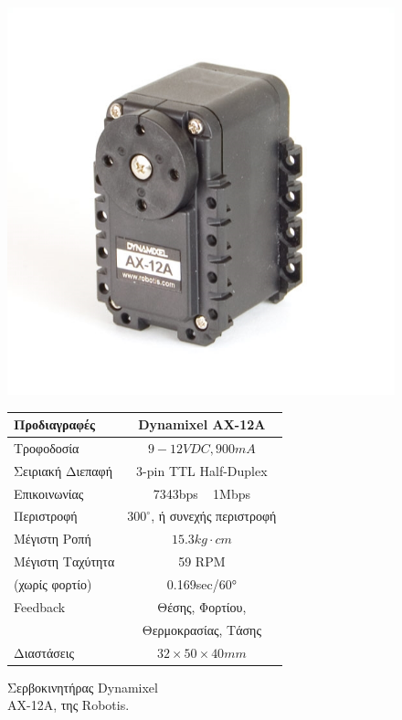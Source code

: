 \begin{figure}[!ht]
	\begin{minipage}[b]{0.44\textwidth}
		\centering
		\includegraphics[width=0.8\linewidth]{Chapters/Chapter2/Figures/dxl_ax_12a.png}
		\caption{Σερβοκινητήρας Dynamixel\\ AX-12A, της Robotis.}
		\label{fig:dxl_ax_12a}
	\end{minipage}		
	\begin{minipage}[b]{0.55\textwidth}
		\centering
		\begin{tabular}{| l | c |}
			\hline
			\textbf{Προδιαγραφές} & \textbf{Dynamixel AX-12A}\\ \hline
			Τροφοδοσία & $9-12VDC, 900mA$\\ \hline
			Σειριακή Διεπαφή& 3-pin TTL Half-Duplex\\
			Επικοινωνίας  & 7343bps ~ 1Mbps\\ \hline
			Περιστροφή & $300^{\circ}$, ή συνεχής περιστροφή\\ \hline
			Μέγιστη Ροπή & $15.3 kg \cdot cm$\\ \hline
			Μέγιστη Ταχύτητα & 59 RPM \\ (χωρίς φορτίο) & 0.169sec/60°\\ \hline
			Feedback & Θέσης, Φορτίου,\\& Θερμοκρασίας, Τάσης\\ \hline
			Διαστάσεις & $32 \times 50 \times 40 mm$\\ \hline
		\end{tabular}
		\label{tab:dxl_ax_12a_specs}
	\end{minipage}
\end{figure}


